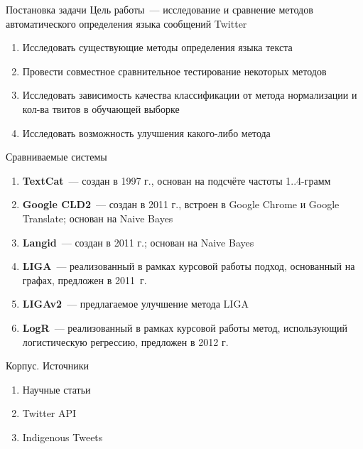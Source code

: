 \documentclass[mathserif,utf8,14pt]{beamer}
\begin{document}
\begin{frame}{Постановка задачи}
    Цель работы~--- исследование и сравнение методов автоматического определения языка сообщений Twitter
    \begin{enumerate}
        \item Исследовать существующие методы определения языка текста
        \item Провести совместное сравнительное тестирование некоторых методов
        \item Исследовать зависимость качества классификации от метода нормализации и кол-ва твитов в
            обучающей выборке
        \item Исследовать возможность улучшения какого-либо метода
    \end{enumerate}
\end{frame}

\begin{frame}{Сравниваемые системы}
    \begin{enumerate}
        \item \textbf{TextCat}~--- создан в 1997 г., основан на подсчёте частоты 1..4-грамм
        \item \textbf{Google CLD2}~--- создан в 2011 г., встроен в Google Chrome и Google Translate; основан на Naive Bayes
        \item \textbf{Langid}~--- создан в 2011 г.; основан на Naive Bayes
        \item \textbf{LIGA}~--- реализованный в рамках курсовой работы подход, основанный на графах, предложен в 2011~г.
        \item \textbf{LIGAv2}~--- предлагаемое улучшение метода LIGA
        \item \textbf{LogR}~--- реализованный в рамках курсовой работы метод, использующий логистическую регрессию, предложен в 2012 г.
    \end{enumerate}
\end{frame}

\begin{frame}{Корпус. Источники}
    \begin{enumerate}
        \item Научные статьи
        \item Twitter API
        \item Indigenous Tweets
    \end{enumerate}
\end{frame}
\end{document}
